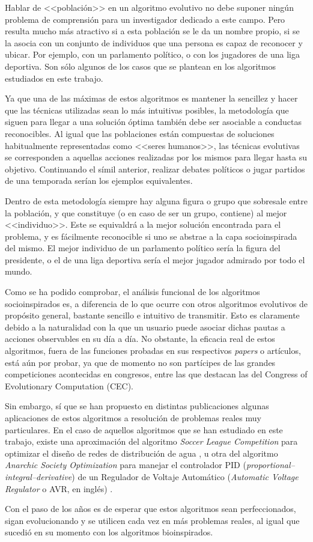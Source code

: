 Hablar de <<población>> en un algoritmo evolutivo no debe suponer ningún problema de comprensión para un investigador dedicado a este campo. Pero resulta mucho más atractivo si a esta población se le da un nombre propio, si se la asocia con un conjunto de individuos que una persona es capaz de reconocer y ubicar. Por ejemplo, con un parlamento político, o con los jugadores de una liga deportiva. Son sólo algunos de los casos que se plantean en los algoritmos estudiados en este trabajo.

Ya que una de las máximas de estos algoritmos es mantener la sencillez y hacer que las técnicas utilizadas sean lo más intuitivas posibles, la metodología que siguen para llegar a una solución óptima también debe ser asociable a conductas reconocibles. Al igual que las poblaciones están compuestas de soluciones habitualmente representadas como <<seres humanos>>, las técnicas evolutivas se corresponden a aquellas acciones realizadas por los mismos para llegar hasta su objetivo. Continuando el símil anterior, realizar debates políticos o jugar partidos de una temporada serían los ejemplos equivalentes.

Dentro de esta metodología siempre hay alguna figura o grupo que sobresale entre la población, y que constituye (o en caso de ser un grupo, contiene) al mejor <<individuo>>. Este se equivaldrá a la mejor solución encontrada para el problema, y es fácilmente reconocible si uno se abstrae a la capa socioinspirada del mismo. El mejor individuo de un parlamento político sería la figura del presidente, o el de una liga deportiva sería el mejor jugador admirado por todo el mundo.

Como se ha podido comprobar, el análisis funcional de los algoritmos socioinspirados es, a diferencia de lo que ocurre con otros algoritmos evolutivos de propósito general, bastante sencillo e intuitivo de transmitir. Esto es claramente debido a la naturalidad con la que un usuario puede asociar dichas pautas a acciones observables en su día a día. No obstante, la eficacia real de estos algoritmos, fuera de las funciones probadas en sus respectivos \textit{papers} o artículos, está aún por probar, ya que de momento no son partícipes de las grandes competiciones acontecidas en congresos, entre las que destacan las del Congress of Evolutionary Computation (CEC).

Sin embargo, sí que se han propuesto en distintas publicaciones algunas aplicaciones de estos algoritmos a resolución de problemas reales muy particulares. En el caso de aquellos algoritmos que se han estudiado en este trabajo, existe una aproximación del algoritmo \textit{Soccer League Competition} para optimizar el diseño de redes de distribución de agua \cite{slc-article}, u otra del algoritmo \textit{Anarchic Society Optimization} para manejar el controlador PID (\textit{proportional–integral–derivative}) de un Regulador de Voltaje Automático (\textit{Automatic Voltage Regulator} o AVR, en inglés) \cite{aso-article}.

Con el paso de los años es de esperar que estos algoritmos sean perfeccionados, sigan evolucionando y se utilicen cada vez en más problemas reales, al igual que sucedió en su momento con los algoritmos bioinspirados.
